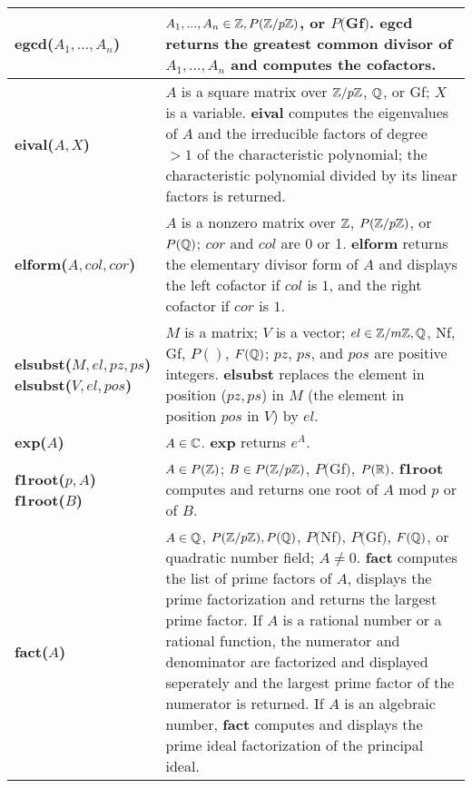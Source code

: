 {\begin{tabular}{|p{1.95in}|p{3.83in}|}
{\bf egcd($A_1,...,A_n$)} &
$A_1,...,A_n \in \mbox{$\mathbb Z$}, P(\mbox{$\mathbb Z$}/p\mbox{$\mathbb Z$})$, or $P($Gf$)$. \newline
{\bf egcd} returns the greatest common divisor of $A_1,...,A_n$ and
computes the cofactors.\\ \hline

{\bf eival($A,X$)} &
$A$ is a square matrix over $\mbox{$\mathbb Z$}/p\mbox{$\mathbb Z$}$, $\mbox{$\mathbb Q$}$, or Gf;\newline
$X$ is a variable.\newline
{\bf eival} computes the eigenvalues of $A$ and the irreducible factors of degree
$> 1$ of the characteristic polynomial; the characteristic polynomial divided by
its linear factors is returned.\\ \hline

{\bf elform($A,col,cor$)} &
$A$ is a nonzero matrix over $\mbox{$\mathbb Z$}$, $P(\mbox{$\mathbb Z$}/p\mbox{$\mathbb Z$})$, or $P(\mbox{$\mathbb Q$})$;\newline
$cor$ and $col$ are 0 or 1.\newline
{\bf elform} returns the elementary divisor form of $A$
and displays the left cofactor if $col$ is $1$,
and the right cofactor if $cor$ is $1$.\\ \hline

{\bf elsubst($M,el,pz,ps$)}\newline
{\bf elsubst($V,el,pos$)} &
$M$ is a matrix; $V$ is a vector;\newline
$el \in \mbox{$\mathbb Z$}/m\mbox{$\mathbb Z$}, \mbox{$\mathbb Q$}$, Nf, Gf, $P()$, $F(\mbox{$\mathbb Q$})$;\newline
$pz$, $ps$, and $pos$ are positive integers.\newline
{\bf elsubst} replaces the element in position ($pz,ps$) in $M$ (the element in
position $pos$ in $V$) by $el$.\\ \hline

{\bf exp($A$)} &
$A \in \mbox{$\mathbb C$}$.\newline
{\bf exp} returns $e^A$.\\ \hline

{\bf f1root($p,A$)}\newline
{\bf f1root($B$)} &
$A\in P(\mbox{$\mathbb Z$})$; $B\in P(\mbox{$\mathbb Z$}/p\mbox{$\mathbb Z$})$, $P($Gf$)$, $P(\mbox{$\mathbb R$})$.\newline
{\bf f1root} computes and returns one root of $A$ mod $p$ or of $B$. \\ \hline


{\bf fact($A$)} &
$A \in \mbox{$\mathbb Q$}$, $P(\mbox{$\mathbb Z$}/p\mbox{$\mathbb Z$}), P(\mbox{$\mathbb Q$})$, $P($Nf$)$, $P($Gf$)$, $F(\mbox{$\mathbb Q$})$, or quadratic \newline
\hspace*{0.7cm}number field; $A \neq 0$.\newline
{\bf fact} computes the list of prime factors of $A$, displays the prime factorization and returns the largest
prime factor. If $A$ is a rational number or a rational function, the numerator
and denominator are factorized and displayed seperately and the largest prime factor of the
numerator is returned. If $A$ is an algebraic number, {\bf fact} computes and displays the prime ideal
factorization of the principal ideal.\\ \hline


\end{tabular}}
